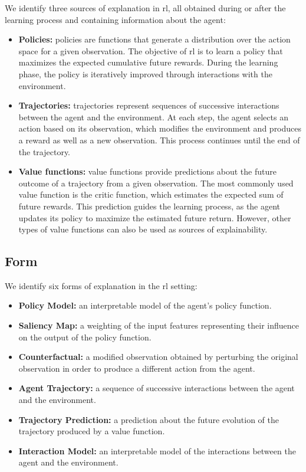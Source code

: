 We identify three sources of explanation in \gls{rl}, all obtained during or after the learning process and containing information about the agent:
\begin{itemize}
    \item \textbf{Policies:} policies are functions that generate a distribution over the action space for a given observation.
    The objective of \gls{rl} is to learn a policy that maximizes the expected cumulative future rewards.
    During the learning phase, the policy is iteratively improved through interactions with the environment.

    \item \textbf{Trajectories:} trajectories represent sequences of successive interactions between the agent and the environment.
    At each step, the agent selects an action based on its observation, which modifies the environment and produces a reward as well as a new observation.
    This process continues until the end of the trajectory.

    \item \textbf{Value functions:} value functions provide predictions about the future outcome of a trajectory from a given observation.
    The most commonly used value function is the critic function, which estimates the expected sum of future rewards.
    This prediction guides the learning process, as the agent updates its policy to maximize the estimated future return.
    However, other types of value functions can also be used as sources of explainability.
\end{itemize}

\subsection{Form}
\label{subsec:form}

We identify six forms of explanation in the \gls{rl} setting:
\begin{itemize}
    \item \textbf{Policy Model:} an interpretable model of the agent's policy function.
    
    \item \textbf{Saliency Map:} a weighting of the input features representing their influence on the output of the policy function.
    
    \item \textbf{Counterfactual:} a modified observation obtained by perturbing the original observation in order to produce a different action from the agent.
    
    \item \textbf{Agent Trajectory:} a sequence of successive interactions between the agent and the environment.
    
    \item \textbf{Trajectory Prediction:} a prediction about the future evolution of the trajectory produced by a value function.
    
    \item \textbf{Interaction Model:} an interpretable model of the interactions between the agent and the environment.
\end{itemize}

